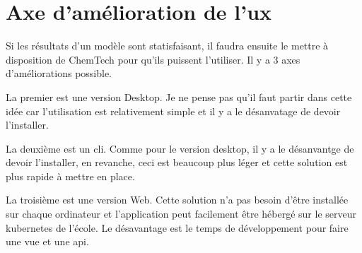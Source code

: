 \section{Axe d'amélioration de l'\acrshort{ux}}
Si les résultats d'un modèle sont statisfaisant, il faudra ensuite le mettre à disposition de ChemTech pour qu'ils puissent l'utiliser.
Il y a 3 axes d'améliorations possible.

La premier est une version Desktop.
Je ne pense pas qu'il faut partir dans cette idée car l'utilisation est relativement simple et il y a le désanvatage de devoir l'installer.

La deuxième est un \acrfull{cli}.
Comme pour le version desktop, il y a le désanvantge de devoir l'installer, en revanche, ceci est beaucoup plus léger et cette solution est plus rapide à mettre en place.

La troisième est une version Web.
Cette solution n'a pas besoin d'être installée sur chaque ordinateur et l'application peut facilement être hébergé sur le serveur kubernetes de l'école.
Le désavantage est le temps de développement pour faire une vue et une \acrfull{api}.


